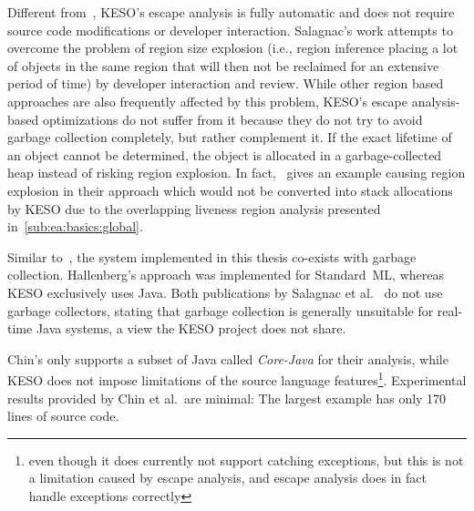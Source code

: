 	Different from~\cite{grossman:02:pldi, salagnac:07:rtcsa}, KESO's escape analysis is fully automatic and does not
	require source code modifications or developer interaction. Salagnac's work attempts to overcome the problem of region
	size explosion (i.e., region inference placing a lot of objects in the same region that will then not be reclaimed for
	an extensive period of time) by developer interaction and review. While other region based approaches are also
	frequently affected by this problem, KESO's escape analysis-based optimizations do not suffer from it because they do
	not try to avoid garbage collection completely, but rather complement it. If the exact lifetime of an object cannot be
	determined, the object is allocated in a garbage-collected heap instead of risking region explosion. In
	fact,~\cite{salagnac:07:rtcsa} gives an example causing region explosion in their approach which would not be
	converted into stack allocations by KESO due to the overlapping liveness region analysis presented
	in~\cref{sub:ea:basics:global}.

	Similar to~\cite{hallenberg:02:sigplan}, the system implemented in this thesis co-exists with garbage collection.
	Hallenberg's approach was implemented for Standard~ML, whereas KESO exclusively uses Java. Both publications by
	Salagnac et al.~\cite{salagnac:05:aiool, salagnac:07:rtcsa} do not use garbage collectors, stating that garbage
	collection is generally unsuitable for real-time Java systems, a view the KESO project does not share.

	Chin's \cite{chin:04:pldi} only supports a subset of Java called \emph{Core-Java} for their analysis, while KESO does
	not impose limitations of the source language features\footnote{even though it does currently not support catching
	exceptions, but this is not a limitation caused by escape analysis, and escape analysis does in fact handle exceptions
	correctly}. Experimental results provided by Chin et al.\ are minimal: The largest example has only 170 lines of
	source code.

